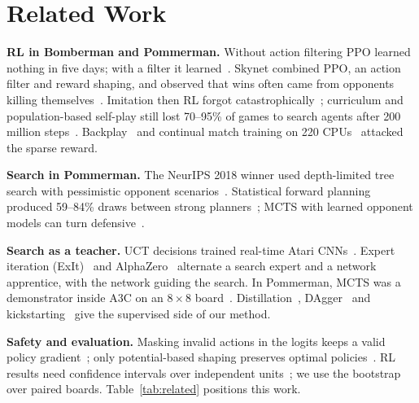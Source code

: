 \documentclass[journal]{IEEEtran}
\begin{document}
\section{Related Work}

\textbf{RL in Bomberman and Pommerman.} Without action filtering PPO learned nothing in five days; with a filter it learned~\cite{gao2019hard}. Skynet combined PPO, an action filter and reward shaping, and observed that wins often came from opponents killing themselves~\cite{gao2019skynet}. Imitation then RL forgot catastrophically~\cite{meisheri2019}; curriculum and population-based self-play still lost 70--95\% of games to search agents after 200 million steps~\cite{huynh2024}. Backplay~\cite{resnick2018backplay} and continual match training on 220 CPUs~\cite{peng2018continual} attacked the sparse reward.

\textbf{Search in Pommerman.} The NeurIPS 2018 winner used depth-limited tree search with pessimistic opponent scenarios~\cite{osogami2019}. Statistical forward planning produced 59--84\% draws between strong planners~\cite{perezliebana2019}; MCTS with learned opponent models can turn defensive~\cite{weil2023}.

\textbf{Search as a teacher.} UCT decisions trained real-time Atari CNNs~\cite{guo2014uct}. Expert iteration (ExIt)~\cite{anthony2017exit} and AlphaZero~\cite{silver2017agz,silver2017alphazero} alternate a search expert and a network apprentice, with the network guiding the search. In Pommerman, MCTS was a demonstrator inside A3C on an $8\times8$ board~\cite{kartal2018demonstrator,kartal2019safer}. Distillation~\cite{hinton2015distill,rusu2016distill}, DAgger~\cite{ross2011dagger} and kickstarting~\cite{schmitt2018kickstart} give the supervised side of our method.

\textbf{Safety and evaluation.} Masking invalid actions in the logits keeps a valid policy gradient~\cite{huang2022masking}; only potential-based shaping preserves optimal policies~\cite{ng1999shaping}. RL results need confidence intervals over independent units~\cite{henderson2018matters,agarwal2021precipice}; we use the bootstrap~\cite{efron1979bootstrap} over paired boards. Table~\ref{tab:related} positions this work.
\end{document}

